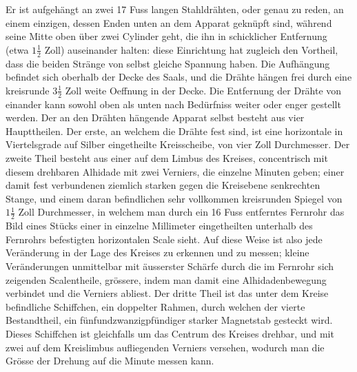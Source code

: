Er ist aufgehängt an zwei 17 Fuss langen Stahldrähten, oder genau zu reden, an einem einzigen, dessen Enden unten an dem Apparat geknüpft sind, während seine Mitte oben über zwei Cylinder geht, die ihn in schicklicher Entfernung (etwa $1\frac{1}{2}$ Zoll) auseinander halten: diese Einrichtung hat zugleich den Vortheil, dass die beiden Stränge von selbst gleiche Spannung haben. Die Aufhängung befindet sich oberhalb der Decke des Saals, und die Drähte hängen frei durch eine kreisrunde $3\frac{1}{2}$ Zoll weite Oeffnung in der Decke. Die Entfernung der Drähte von einander kann sowohl oben als unten nach Bedürfniss weiter oder enger gestellt werden. Der an den Drähten hängende Apparat selbst besteht aus vier Haupttheilen. Der erste, an welchem die Drähte fest sind, ist eine horizontale in Viertelsgrade auf Silber eingetheilte Kreisscheibe, von vier Zoll Durchmesser. Der zweite Theil besteht aus einer auf dem Limbus des Kreises, concentrisch mit diesem drehbaren Alhidade mit zwei Verniers, die einzelne Minuten geben; einer damit fest verbundenen ziemlich starken gegen die Kreisebene senkrechten Stange, und einem daran befindlichen sehr vollkommen kreisrunden Spiegel von $1\frac{1}{2}$ Zoll Durchmesser, in welchem man durch ein 16 Fuss entferntes Fernrohr das Bild eines Stücks einer in einzelne Millimeter eingetheilten unterhalb des Fernrohrs befestigten horizontalen Scale sieht. Auf diese Weise ist
also jede Veränderung in der Lage des Kreises zu erkennen und zu messen; kleine Veränderungen unmittelbar mit äusserster Schärfe durch die im Fernrohr sich zeigenden Scalentheile, grössere, indem man damit eine Alhidadenbewegung verbindet und die Verniers abliest. Der dritte Theil ist das unter dem Kreise befindliche Schiffchen, ein doppelter Rahmen, durch welchen der vierte Bestandtheil, ein fünfundzwanzigpfündiger starker Magnetstab gesteckt wird. Dieses Schiffchen ist gleichfalls um das Centrum des Kreises drehbar, und mit zwei auf dem Kreislimbus aufliegenden Verniers versehen, wodurch man die Grösse der Drehung auf die Minute messen kann.

